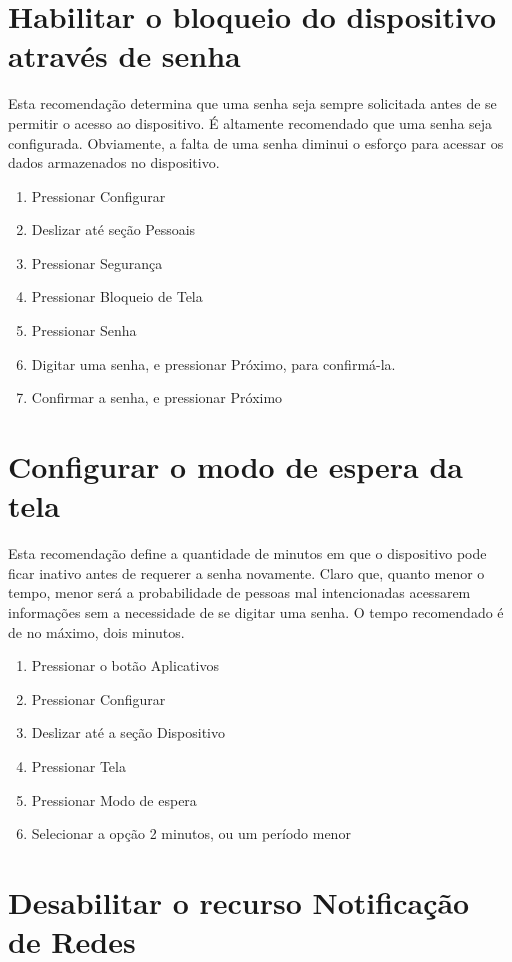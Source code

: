 \section{Habilitar o bloqueio do dispositivo atrav\'es de senha} \label{senha}

Esta recomenda\c c\~ao determina que uma senha seja sempre solicitada antes de se permitir o acesso ao dispositivo. \'E altamente recomendado que uma senha seja configurada. Obviamente, a falta de uma senha diminui o esfor\c co para acessar os dados armazenados no dispositivo.

\begin{enumerate}
\item Pressionar Configurar
\item Deslizar at\'e se\c c\~ao Pessoais
\item Pressionar Seguran\c ca
\item Pressionar Bloqueio de Tela
\item Pressionar Senha
\item Digitar uma senha, e pressionar Pr\'oximo, para confirm\'a-la.
\item Confirmar a senha, e pressionar Pr\'oximo
\end{enumerate}

\section{Configurar o modo de espera da tela}

Esta recomenda\c c\~ao define a quantidade de minutos em que o dispositivo pode ficar inativo antes de requerer a senha novamente. Claro que, quanto menor o tempo, menor ser\'a a probabilidade de pessoas mal intencionadas acessarem informa\c c\~oes sem a necessidade de se digitar uma senha. O tempo recomendado \'e de no m\'aximo, dois minutos.

\begin{enumerate}
\item Pressionar o bot\~ao Aplicativos
\item Pressionar Configurar
\item Deslizar at\'e a se\c c\~ao Dispositivo
\item Pressionar Tela
\item Pressionar Modo de espera
\item Selecionar a op\c c\~ao 2 minutos, ou um per\'iodo menor
\end{enumerate}

\section{Desabilitar o recurso Notifica\c c\~ao de Redes}

